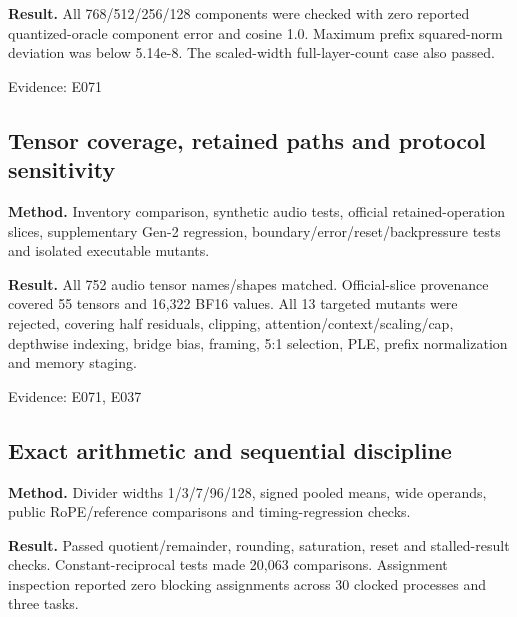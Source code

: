 \documentclass[11pt,a4paper]{article}
\begin{document}
\textbf{Result.} All 768/\allowbreak{}512/\allowbreak{}256/\allowbreak{}128 components were checked with zero reported quantized-oracle component error and cosine 1.0. Maximum prefix squared-norm deviation was below 5.14e-8. The scaled-width full-layer-count case also passed.

{\small Evidence: E071}

\subsection{Tensor coverage,\allowbreak{} retained paths and protocol sensitivity}

\textbf{Method.} Inventory comparison,\allowbreak{} synthetic audio tests,\allowbreak{} official retained-operation slices,\allowbreak{} supplementary Gen-2 regression,\allowbreak{} boundary/\allowbreak{}error/\allowbreak{}reset/\allowbreak{}backpressure tests and isolated executable mutants.

\textbf{Result.} All 752 audio tensor names/\allowbreak{}shapes matched. Official-slice provenance covered 55 tensors and 16,\allowbreak{}322 BF16 values. All 13 targeted mutants were rejected,\allowbreak{} covering half residuals,\allowbreak{} clipping,\allowbreak{} attention/\allowbreak{}context/\allowbreak{}scaling/\allowbreak{}cap,\allowbreak{} depthwise indexing,\allowbreak{} bridge bias,\allowbreak{} framing,\allowbreak{} 5:1 selection,\allowbreak{} PLE,\allowbreak{} prefix normalization and memory staging.

{\small Evidence: E071,\allowbreak{} E037}

\subsection{Exact arithmetic and sequential discipline}

\textbf{Method.} Divider widths 1/\allowbreak{}3/\allowbreak{}7/\allowbreak{}96/\allowbreak{}128,\allowbreak{} signed pooled means,\allowbreak{} wide operands,\allowbreak{} public RoPE/\allowbreak{}reference comparisons and timing-regression checks.

\textbf{Result.} Passed quotient/\allowbreak{}remainder,\allowbreak{} rounding,\allowbreak{} saturation,\allowbreak{} reset and stalled-result checks. Constant-reciprocal tests made 20,\allowbreak{}063 comparisons. Assignment inspection reported zero blocking assignments across 30 clocked processes and three tasks.
\end{document}
